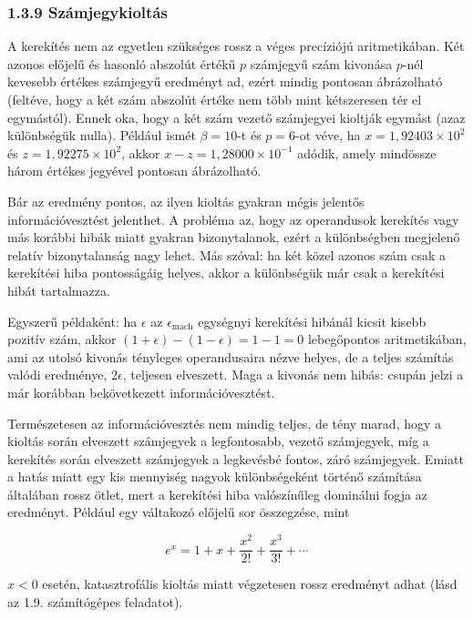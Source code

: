 \documentclass[
  magyar,
  11pt]{article}
\begin{document}
\subsubsection{1.3.9 Számjegykioltás}\label{szuxe1mjegykioltuxe1s}

A kerekítés nem az egyetlen szükséges rossz a véges precíziójú
aritmetikában. Két azonos előjelű és hasonló abszolút értékű \(p\)
számjegyű szám kivonása \(p\)-nél kevesebb értékes számjegyű eredményt
ad, ezért mindig pontosan ábrázolható (feltéve, hogy a két szám abszolút
értéke nem több mint kétszeresen tér el egymástól). Ennek oka, hogy a
két szám vezető számjegyei kioltják egymást (azaz különbségük nulla).
Például ismét \(\beta = 10\)-t és \(p = 6\)-ot véve, ha
\(x = 1{,}92403 \times 10^2\) és \(z = 1{,}92275 \times 10^2\), akkor
\(x - z = 1{,}28000 \times 10^{-1}\) adódik, amely mindössze három
értékes jegyével pontosan ábrázolható.

Bár az eredmény pontos, az ilyen kioltás gyakran mégis jelentős
információvesztést jelenthet. A probléma az, hogy az operandusok
kerekítés vagy más korábbi hibák miatt gyakran bizonytalanok, ezért a
különbségben megjelenő relatív bizonytalanság nagy lehet. Más szóval: ha
két közel azonos szám csak a kerekítési hiba pontosságáig helyes, akkor
a különbségük már csak a kerekítési hibát tartalmazza.

Egyszerű példaként: ha \(\epsilon\) az \(\epsilon_{\text{mach}}\)
egységnyi kerekítési hibánál kicsit kisebb pozitív szám, akkor
\((1 + \epsilon) - (1 - \epsilon) = 1 - 1 = 0\) lebegőpontos
aritmetikában, ami az utolsó kivonás tényleges operandusaira nézve
helyes, de a teljes számítás valódi eredménye, \(2\epsilon\), teljesen
elveszett. Maga a kivonás nem hibás: csupán jelzi a már korábban
bekövetkezett információvesztést.

Természetesen az információvesztés nem mindig teljes, de tény marad,
hogy a kioltás során elveszett számjegyek a legfontosabb, vezető
számjegyek, míg a kerekítés során elveszett számjegyek a legkevésbé
fontos, záró számjegyek. Emiatt a hatás miatt egy kis mennyiség nagyok
különbségeként történő számítása általában rossz ötlet, mert a
kerekítési hiba valószínűleg dominálni fogja az eredményt. Például egy
váltakozó előjelű sor összegzése, mint

\[e^x = 1 + x + \frac{x^2}{2!} + \frac{x^3}{3!} + \cdots\]

\(x < 0\) esetén, katasztrofális kioltás miatt végzetesen rossz
eredményt adhat (lásd az 1.9. számítógépes feladatot).
\end{document}
